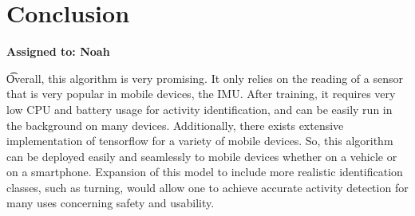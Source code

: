 \documentclass{article}
\begin{document}
\section{Conclusion}
\vspace{-.3cm}
\textbf{Assigned to: Noah}

\t Overall, this algorithm is very promising. It only relies on the reading of a sensor that is very popular in mobile devices, the IMU. After training, it requires very low CPU and battery usage for activity identification, and can be easily run in the background on many devices. Additionally, there exists extensive implementation of tensorflow for a variety of mobile devices. So, this algorithm can be deployed easily and seamlessly to mobile devices whether on a vehicle or on a smartphone. Expansion of this model to include more realistic identification classes, such as turning, would allow one to achieve accurate activity detection for many uses concerning safety and usability.



{\scriptsize%

}
\end{document}
